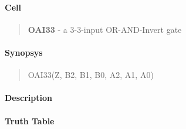 \label{OAI33}
\paragraph{Cell}
\begin{quote}
    \textbf{OAI33} - a 3-3-input OR-AND-Invert gate
\end{quote}

\paragraph{Synopsys}
\begin{quote}
    OAI33(Z, B2, B1, B0, A2, A1, A0)
\end{quote}

\paragraph{Description}

%

\paragraph{Truth Table}


